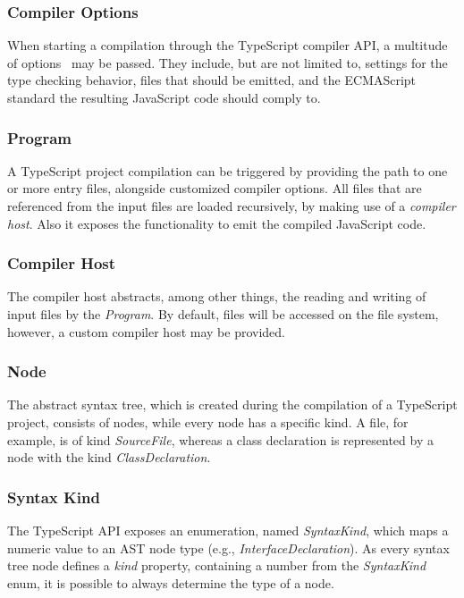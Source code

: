\subsubsection{Compiler Options}

When starting a compilation through the TypeScript compiler API, a multitude of options~\cite{TypeScriptHandbook:CompilerOptions} may be passed. They include, but are not limited to, settings for the type checking behavior, files that should be emitted, and the ECMAScript standard the resulting JavaScript code should comply to.

\subsubsection{Program}

A TypeScript project compilation can be triggered by providing the path to one or more entry files, alongside customized compiler options. All files that are referenced from the input files are loaded recursively, by making use of a \emph{compiler host}. Also it exposes the functionality to emit the compiled JavaScript code.

\subsubsection{Compiler Host}

The compiler host abstracts, among other things, the reading and writing of input files by the \emph{Program}. By default, files will be accessed on the file system, however, a custom compiler host may be provided.

\subsubsection{Node}

The abstract syntax tree, which is created during the compilation of a TypeScript project, consists of nodes, while every node has a specific kind. A file, for example, is of kind \emph{SourceFile}, whereas a class declaration is represented by a node with the kind \emph{ClassDeclaration}.

\subsubsection{Syntax Kind}

The TypeScript API exposes an enumeration, named \emph{SyntaxKind}, which maps a numeric value to an AST node type (e.g., \emph{InterfaceDeclaration}). As every syntax tree node defines a \emph{kind} property, containing a number from the \emph{SyntaxKind} enum, it is possible to always determine the type of a node.

